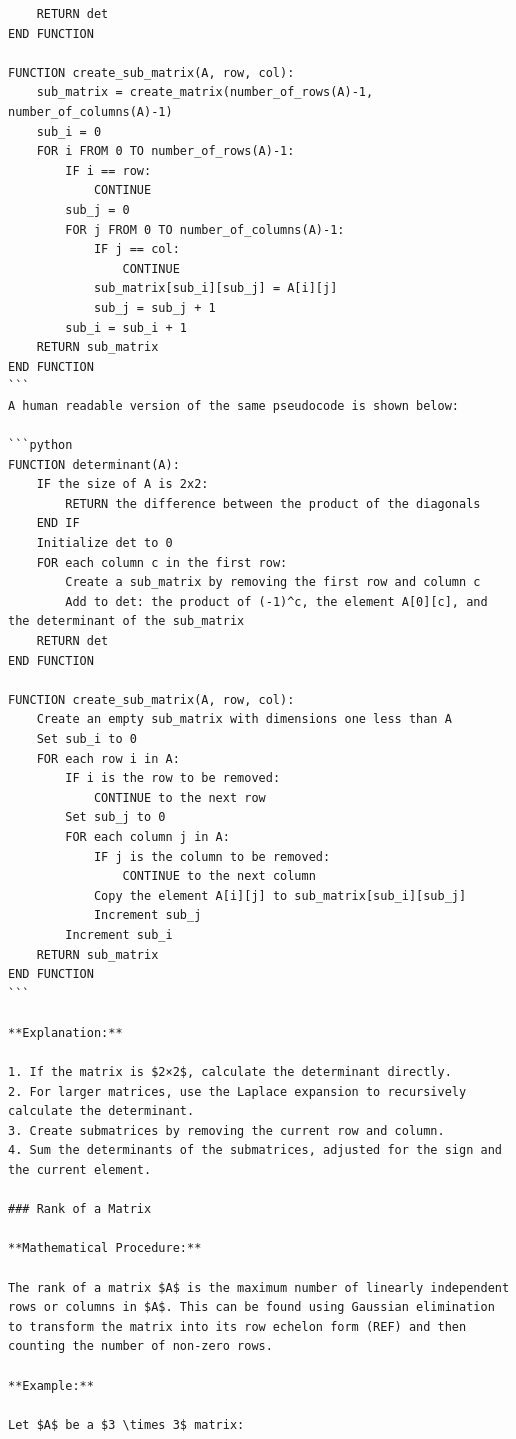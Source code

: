 \documentclass[
  letterpaper,
  DIV=11,
  numbers=noendperiod]{scrreprt}
\theoremstyle{plain}
\theoremstyle{definition}
\theoremstyle{remark}
\begin{document}
\begin{verbatim}
    RETURN det
END FUNCTION

FUNCTION create_sub_matrix(A, row, col):
    sub_matrix = create_matrix(number_of_rows(A)-1, number_of_columns(A)-1)
    sub_i = 0
    FOR i FROM 0 TO number_of_rows(A)-1:
        IF i == row:
            CONTINUE
        sub_j = 0
        FOR j FROM 0 TO number_of_columns(A)-1:
            IF j == col:
                CONTINUE
            sub_matrix[sub_i][sub_j] = A[i][j]
            sub_j = sub_j + 1
        sub_i = sub_i + 1
    RETURN sub_matrix
END FUNCTION
```
A human readable version of the same pseudocode is shown below:

```python
FUNCTION determinant(A):
    IF the size of A is 2x2:
        RETURN the difference between the product of the diagonals
    END IF
    Initialize det to 0
    FOR each column c in the first row:
        Create a sub_matrix by removing the first row and column c
        Add to det: the product of (-1)^c, the element A[0][c], and the determinant of the sub_matrix
    RETURN det
END FUNCTION

FUNCTION create_sub_matrix(A, row, col):
    Create an empty sub_matrix with dimensions one less than A
    Set sub_i to 0
    FOR each row i in A:
        IF i is the row to be removed:
            CONTINUE to the next row
        Set sub_j to 0
        FOR each column j in A:
            IF j is the column to be removed:
                CONTINUE to the next column
            Copy the element A[i][j] to sub_matrix[sub_i][sub_j]
            Increment sub_j
        Increment sub_i
    RETURN sub_matrix
END FUNCTION
```

**Explanation:**

1. If the matrix is $2×2$, calculate the determinant directly.
2. For larger matrices, use the Laplace expansion to recursively calculate the determinant.
3. Create submatrices by removing the current row and column.
4. Sum the determinants of the submatrices, adjusted for the sign and the current element.

### Rank of a Matrix

**Mathematical Procedure:**

The rank of a matrix $A$ is the maximum number of linearly independent rows or columns in $A$. This can be found using Gaussian elimination to transform the matrix into its row echelon form (REF) and then counting the number of non-zero rows.

**Example:**

Let $A$ be a $3 \times 3$ matrix:


\end{verbatim}
\end{document}
